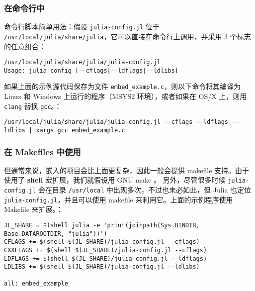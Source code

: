 \hypertarget{15399362667106734470}{}


\subsubsection{在命令行中}



命令行脚本简单用法：假设 \texttt{julia-config.jl} 位于 \texttt{/usr/local/julia/share/julia}，它可以直接在命令行上调用，并采用 3 个标志的任意组合：




\begin{lstlisting}
/usr/local/julia/share/julia/julia-config.jl
Usage: julia-config [--cflags|--ldflags|--ldlibs]
\end{lstlisting}



如果上面的示例源代码保存为文件 \texttt{embed\_example.c}，则以下命令将其编译为 Linux 和 Windows 上运行的程序（MSYS2 环境），或者如果在 OS/X 上，则用 \texttt{clang} 替换 \texttt{gcc}。：




\begin{lstlisting}
/usr/local/julia/share/julia/julia-config.jl --cflags --ldflags --ldlibs | xargs gcc embed_example.c
\end{lstlisting}



\hypertarget{9935040774481087943}{}


\subsubsection{在 Makefiles 中使用}



但通常来说，嵌入的项目会比上面更复杂，因此一般会提供 makefile 支持。由于使用了 \textbf{shell} 宏扩展，我们就假设用 GNU make 。 另外，尽管很多时候 \texttt{julia-config.jl} 会在目录 \texttt{/usr/local} 中出现多次，不过也未必如此，但 Julia 也定位 \texttt{julia-config.jl}，并且可以使用 makefile 来利用它。上面的示例程序使用 Makefile 来扩展。：




\begin{lstlisting}
JL_SHARE = $(shell julia -e 'print(joinpath(Sys.BINDIR, Base.DATAROOTDIR, "julia"))')
CFLAGS += $(shell $(JL_SHARE)/julia-config.jl --cflags)
CXXFLAGS += $(shell $(JL_SHARE)/julia-config.jl --cflags)
LDFLAGS += $(shell $(JL_SHARE)/julia-config.jl --ldflags)
LDLIBS += $(shell $(JL_SHARE)/julia-config.jl --ldlibs)

all: embed_example
\end{lstlisting}



